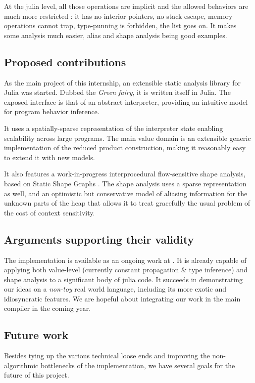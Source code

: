 \documentclass[11pt]{article}
\begin{document}
At the julia level, all those operations are implicit and the allowed behaviors are much more restricted : it has no interior pointers, no stack escape, memory operations cannot trap, type-punning is forbidden, the list goes on. It makes some analysis much easier, alias and shape analysis being good examples.


\subsection*{Proposed contributions}

As the main project of this internship, an extensible static analysis library for Julia was started. Dubbed the \emph{Green fairy}, it is written itself in Julia. The exposed interface is that of an abstract interpreter, providing an intuitive model for program behavior inference.

It uses a spatially-sparse representation of the interpreter state enabling scalability across large programs. The main value domain is an extensible generic implementation of the reduced product construction, making it reasonably easy to extend it with new models.

It also features a work-in-progress interprocedural flow-sensitive shape analysis, based on Static Shape Graphs \cite{ssc}. The shape analysis uses a sparse representation as well, and an optimistic but conservative model of aliasing information for the unknown parts of the heap that allows it to treat gracefully the usual problem of the cost of context sensitivity.

\subsection*{Arguments supporting their validity}

The implementation is available as an ongoing work at \cite{gf-web}. It is already capable of applying both value-level (currently constant propagation \& type inference) and shape analysis to a significant body of julia code.
It succeeds in demonstrating our ideas on a \emph{non-toy} real world language, including its more exotic and idiosyncratic features.
We are hopeful about integrating our work in the main compiler in the coming year.

\subsection*{Future work}

Besides tying up the various technical loose ends and improving the non-algorithmic bottlenecks of the implementation, we have several goals for the future of this project.
\end{document}
